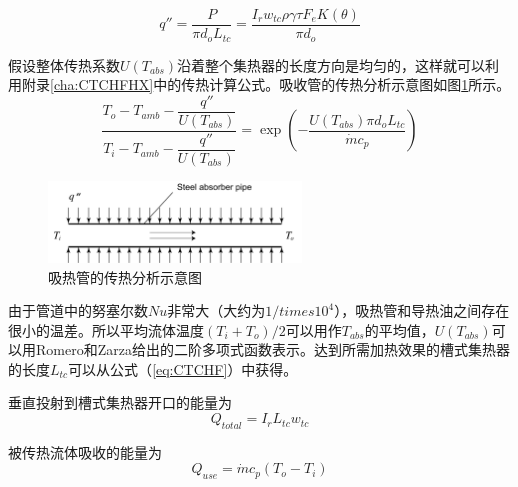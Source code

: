 \begin{equation}
  q''= \frac{P}{\pi d_o L_{tc}} = \frac{I_r w_{tc} \rho \gamma \tau F_e K(\theta)}{\pi d_o}
\end{equation}


假设整体传热系数$U(T_{abs})$沿着整个集热器的长度方向是均匀的，这样就可以利用附录\ref{cha:CTCHFHX}中的传热计算公式。吸收管的传热分析示意图如图\ref{fig:Pipe}所示。
\begin{equation}
	\frac{T_{o}-T_{amb}-\dfrac{q''}{U(T_{abs})}}{T_{i}-T_{amb}-\dfrac{q''}{U(T_{abs})}}=\exp(-\frac{U(T_{abs})\pi d_o L_{tc}}{\dot{m}c_{p}})\label{eq:CTCHF}
\end{equation}

\begin{figure}[!ht]
\centering
\includegraphics[width=0.6\textwidth]{fig/Pipe.pdf}
\caption{吸热管的传热分析示意图}\label{fig:Pipe}
\end{figure}

由于管道中的努塞尔数$Nu$非常大（大约为$1/times10^4$），吸热管和导热油之间存在很小的温差。所以平均流体温度$(T_{i}+T_{o})/2$可以用作$T_{abs}$的平均值，$U(T_{abs})$可以用Romero和Zarza给出的二阶多项式函数表示\cite{Romero2007}。达到所需加热效果的槽式集热器的长度$L_{tc}$可以从公式（\ref{eq:CTCHF}）中获得。

垂直投射到槽式集热器开口的能量为
\begin{equation}
  Q_{total} = I_r L_{tc} w_{tc}
\end{equation}

被传热流体吸收的能量为
\begin{equation}
  Q_{use} = \dot{m}c_p(T_o - T_i)
\end{equation}

